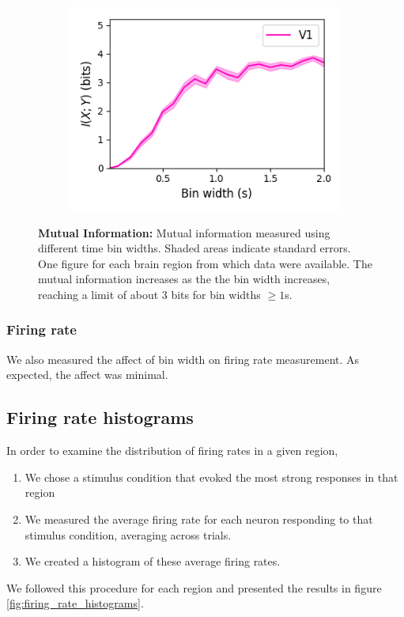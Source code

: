 \documentclass[a4paper,12pt]{article}
\theoremstyle{definition}
\begin{document}
\begin{figure}[p]
\begin{subfigure}{0.5\textwidth}
    \includegraphics[width=\textwidth]{figures/linear_mutual_info_by_bin_width_v1_6.png}
  \end{subfigure}
  \caption{\textbf{Mutual Information:} Mutual information measured using different time bin widths. Shaded areas indicate standard errors. One figure for each brain region from which data were available. The mutual information increases as the the bin width increases, reaching a limit of about $3$ bits for bin widths $\geq 1$s.}
  \label{fig:linear_bin_width_vs_mutual_information_by_region}
\end{figure}

\subsubsection{Firing rate}
We also measured the affect of bin width on firing rate measurement. As expected, the affect was minimal.

\subsection{Firing rate histograms}
In order to examine the distribution of firing rates in a given region, 
\begin{enumerate}
  \item We chose a stimulus condition that evoked the most strong responses in that region 
  \item We measured the average firing rate for each neuron responding to that stimulus condition, averaging across trials.
  \item We created a histogram of these average firing rates.
\end{enumerate}
We followed this procedure for each region and presented the results in figure \ref{fig:firing_rate_histograms}. 
\end{document}

